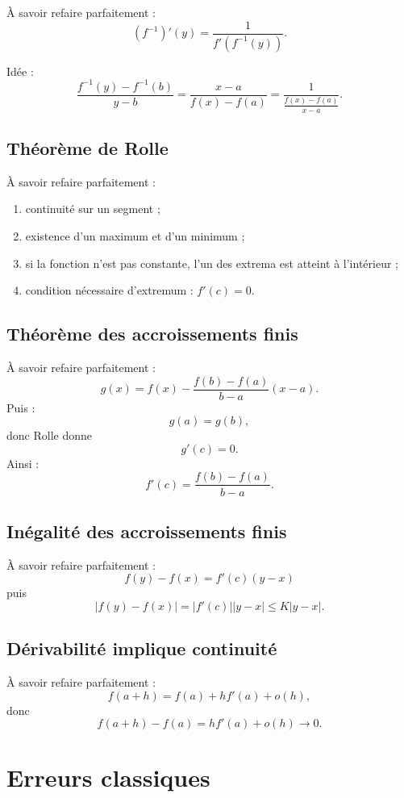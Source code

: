 \documentclass[11pt,a4paper]{article}
\begin{document}
À savoir refaire parfaitement :
\[
(f^{-1})'(y)=\frac1{f'(f^{-1}(y))}.
\]

Idée :
\[
\frac{f^{-1}(y)-f^{-1}(b)}{y-b}
=
\frac{x-a}{f(x)-f(a)}
=
\frac1{\frac{f(x)-f(a)}{x-a}}.
\]

\subsection{Théorème de Rolle}

À savoir refaire parfaitement :
\begin{enumerate}[label=\arabic*)]
    \item continuité sur un segment ;
    \item existence d'un maximum et d'un minimum ;
    \item si la fonction n'est pas constante, l'un des extrema est atteint à l'intérieur ;
    \item condition nécessaire d'extremum : $f'(c)=0$.
\end{enumerate}

\subsection{Théorème des accroissements finis}

À savoir refaire parfaitement :
\[
g(x)=f(x)-\frac{f(b)-f(a)}{b-a}(x-a).
\]
Puis :
\[
g(a)=g(b),
\]
donc Rolle donne
\[
g'(c)=0.
\]
Ainsi :
\[
f'(c)=\frac{f(b)-f(a)}{b-a}.
\]

\subsection{Inégalité des accroissements finis}

À savoir refaire parfaitement :
\[
f(y)-f(x)=f'(c)(y-x)
\]
puis
\[
|f(y)-f(x)|=|f'(c)||y-x|\leq K|y-x|.
\]

\subsection{Dérivabilité implique continuité}

À savoir refaire parfaitement :
\[
f(a+h)=f(a)+hf'(a)+o(h),
\]
donc
\[
f(a+h)-f(a)=hf'(a)+o(h)\to0.
\]

\section{Erreurs classiques}
\end{document}
